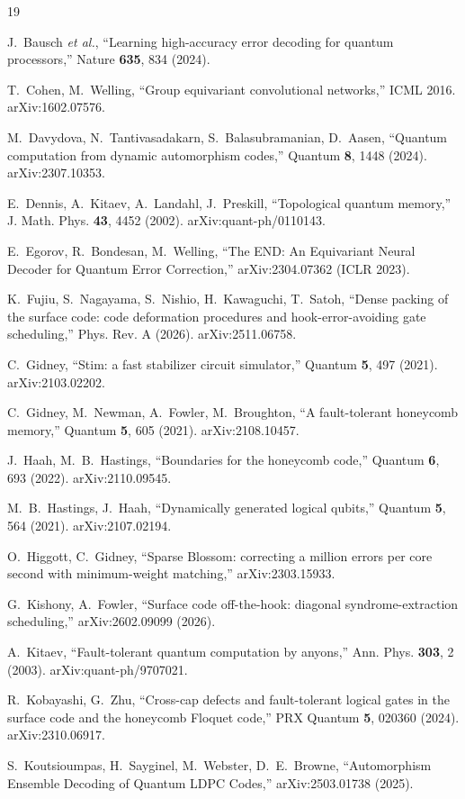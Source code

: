 \documentclass[11pt]{article}
\begin{document}
\begin{thebibliography}{19}

 J.~Bausch \emph{et al.}, ``Learning high-accuracy error
decoding for quantum processors,'' Nature \textbf{635}, 834 (2024).

 T.~Cohen, M.~Welling, ``Group equivariant convolutional
networks,'' ICML 2016. arXiv:1602.07576.

 M.~Davydova, N.~Tantivasadakarn, S.~Balasubramanian,
D.~Aasen, ``Quantum computation from dynamic automorphism codes,'' Quantum
\textbf{8}, 1448 (2024). arXiv:2307.10353.

 E.~Dennis, A.~Kitaev, A.~Landahl, J.~Preskill,
``Topological quantum memory,'' J. Math. Phys. \textbf{43}, 4452 (2002).
arXiv:quant-ph/0110143.

 E.~Egorov, R.~Bondesan, M.~Welling, ``The END: An
Equivariant Neural Decoder for Quantum Error Correction,''
arXiv:2304.07362 (ICLR 2023).

 K.~Fujiu, S.~Nagayama, S.~Nishio, H.~Kawaguchi,
T.~Satoh, ``Dense packing of the surface code: code deformation procedures
and hook-error-avoiding gate scheduling,'' Phys. Rev. A (2026).
arXiv:2511.06758.

 C.~Gidney, ``Stim: a fast stabilizer circuit
simulator,'' Quantum \textbf{5}, 497 (2021). arXiv:2103.02202.

 C.~Gidney, M.~Newman, A.~Fowler, M.~Broughton, ``A
fault-tolerant honeycomb memory,'' Quantum \textbf{5}, 605 (2021).
arXiv:2108.10457.

 J.~Haah, M.~B.~Hastings, ``Boundaries for the honeycomb
code,'' Quantum \textbf{6}, 693 (2022). arXiv:2110.09545.

 M.~B.~Hastings, J.~Haah, ``Dynamically generated logical
qubits,'' Quantum \textbf{5}, 564 (2021). arXiv:2107.02194.

 O.~Higgott, C.~Gidney, ``Sparse Blossom: correcting a
million errors per core second with minimum-weight matching,''
arXiv:2303.15933.

 G.~Kishony, A.~Fowler, ``Surface code off-the-hook:
diagonal syndrome-extraction scheduling,'' arXiv:2602.09099 (2026).

 A.~Kitaev, ``Fault-tolerant quantum computation by
anyons,'' Ann. Phys. \textbf{303}, 2 (2003). arXiv:quant-ph/9707021.

 R.~Kobayashi, G.~Zhu, ``Cross-cap defects and
fault-tolerant logical gates in the surface code and the honeycomb Floquet
code,'' PRX Quantum \textbf{5}, 020360 (2024). arXiv:2310.06917.

 S.~Koutsioumpas, H.~Sayginel, M.~Webster,
D.~E.~Browne, ``Automorphism Ensemble Decoding of Quantum LDPC Codes,''
arXiv:2503.01738 (2025).

\end{thebibliography}
\end{document}
